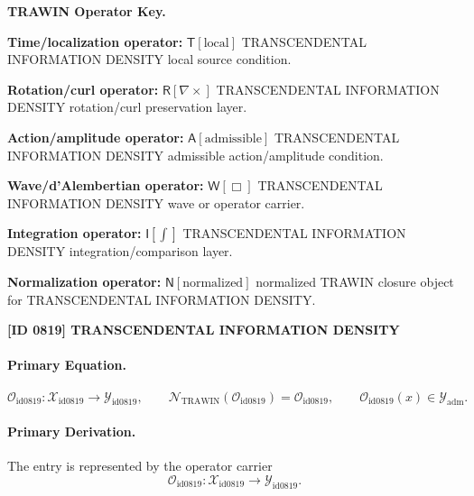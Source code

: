 \par\vspace{0.45\baselineskip}
\noindent\begin{minipage}[t]{\linewidth}
\begingroup
\small
\raggedright
\textbf{TRAWIN Operator Key.}\par
\noindent\textbf{Time/localization operator:} $\mathsf{T}\!\left[\mathrm{local}\right]$ TRANSCENDENTAL INFORMATION DENSITY local source condition.\par
\noindent\textbf{Rotation/curl operator:} $\mathsf{R}\!\left[\nabla\times\right]$ TRANSCENDENTAL INFORMATION DENSITY rotation/curl preservation layer.\par
\noindent\textbf{Action/amplitude operator:} $\mathsf{A}\!\left[\mathrm{admissible}\right]$ TRANSCENDENTAL INFORMATION DENSITY admissible action/amplitude condition.\par
\noindent\textbf{Wave/d'Alembertian operator:} $\mathsf{W}\!\left[\Box\right]$ TRANSCENDENTAL INFORMATION DENSITY wave or operator carrier.\par
\noindent\textbf{Integration operator:} $\mathsf{I}\!\left[\int\right]$ TRANSCENDENTAL INFORMATION DENSITY integration/comparison layer.\par
\noindent\textbf{Normalization operator:} $\mathsf{N}\!\left[\mathrm{normalized}\right]$ normalized TRAWIN closure object for TRANSCENDENTAL INFORMATION DENSITY.\par
\endgroup
\end{minipage}

\clearpage
\noindent\textbf{[ID 0819] TRANSCENDENTAL INFORMATION DENSITY}\par
\vspace{0.35em}
\paragraph{Primary Equation.}
\[
\mathcal{O}_{\mathrm{id0819}}:\mathcal{X}_{\mathrm{id0819}}\longrightarrow \mathcal{Y}_{\mathrm{id0819}},\qquad
\mathcal{N}_{\mathrm{TRAWIN}}(\mathcal{O}_{\mathrm{id0819}})=\mathcal{O}_{\mathrm{id0819}},\qquad
\mathcal{O}_{\mathrm{id0819}}(x)\in\mathcal{Y}_{\mathrm{adm}}.
\]

\paragraph{Primary Derivation.} The entry is represented by the operator carrier\[
\mathcal{O}_{\mathrm{id0819}}:\mathcal{X}_{\mathrm{id0819}}\longrightarrow \mathcal{Y}_{\mathrm{id0819}}.
\]


